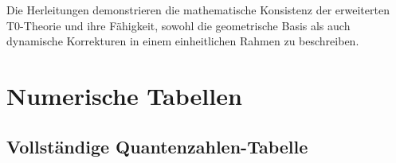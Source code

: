 	Die Herleitungen demonstrieren die mathematische Konsistenz der erweiterten T0-Theorie und ihre Fähigkeit, sowohl die geometrische Basis als auch dynamische Korrekturen in einem einheitlichen Rahmen zu beschreiben.
	
	\section{Numerische Tabellen}
	\label{app:tables}
	
	\subsection{Vollständige Quantenzahlen-Tabelle}
	
	\begin{table}[h]
		\centering
		\small
		\caption{Vollständige Quantenzahlen-Zuordnung für alle Fermionen}
		\label{tab:all_quantum_numbers}
	\end{table}
	

